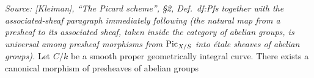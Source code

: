 \begin{theorem}
  \label{thm:rel_pic_etale_sheaf_unit_canonical}

  \textit{Source: [Kleiman], ``The Picard scheme'', \S 2,
  Def.~df:Pfs together with the associated-sheaf paragraph
  immediately following (the natural map from a presheaf to its
  associated sheaf, taken inside the category of abelian groups, is
  universal among presheaf morphisms from \(\operatorname{Pic}_{X/S}\) into \'etale
  sheaves of abelian groups).}
  Let \(C/k\) be a smooth proper geometrically integral curve. There
  exists a canonical morphism of presheaves of abelian groups

\end{theorem}

